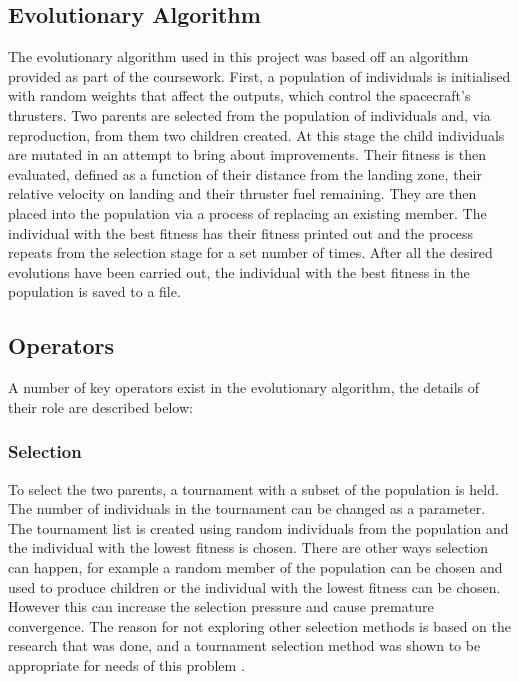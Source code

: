 \documentclass[sigconf]{acmart}
\begin{document}
\subsection{Evolutionary Algorithm}
The evolutionary algorithm used in this project was based off an algorithm provided as part of the coursework. First, a population of individuals is initialised with random weights that affect the outputs, which control the spacecraft's thrusters. Two parents are selected from the population of individuals and, via reproduction, from them two children created. At this stage the child individuals are mutated in an attempt to bring about improvements. Their fitness is then evaluated, defined as a function of their distance from the landing zone, their relative velocity on landing and their thruster fuel remaining. They are then placed into the population via a process of replacing an existing member. The individual with the best fitness has their fitness printed out and the process repeats from the selection stage for a set number of times. After all the desired evolutions have been carried out, the individual with the best fitness in the population is saved to a file.

\subsection{Operators}
A number of key operators exist in the evolutionary algorithm, the details of their role are described below:
\subsubsection{Selection}
To select the two parents, a tournament with a subset of the population is held. The number of individuals in the tournament can be changed as a parameter. The tournament list is created using random individuals from the population and the individual with the lowest fitness is chosen. There are other ways selection can happen, for example a random member of the population can be chosen and used to produce children or the individual with the lowest fitness can be chosen. However this can increase the selection pressure and cause premature convergence. The reason for not exploring other selection methods is based on the research that was done, and a tournament selection method was shown to be appropriate for needs of this problem \cite{blickle96} \cite{goldberg91}.
\end{document}
